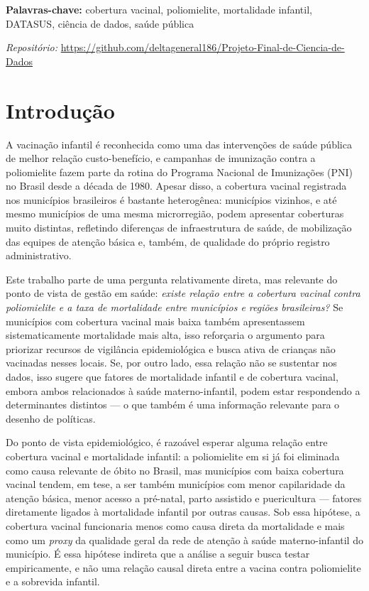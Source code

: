 \documentclass[pdflatex,sn-mathphys-num]{sn-jnl}
\begin{document}
\noindent\textbf{Palavras-chave:} cobertura vacinal, poliomielite, mortalidade infantil, DATASUS, ciência de dados, saúde pública

\noindent\small\emph{Repositório:} \url{https://github.com/deltageneral186/Projeto-Final-de-Ciencia-de-Dados}


\vspace{1em}

\section{Introdução}\label{sec:intro}

A vacinação infantil é reconhecida como uma das intervenções de saúde pública de melhor relação custo-benefício, e campanhas de imunização contra a poliomielite fazem parte da rotina do Programa Nacional de Imunizações (PNI) no Brasil desde a década de 1980. Apesar disso, a cobertura vacinal registrada nos municípios brasileiros é bastante heterogênea: municípios vizinhos, e até mesmo municípios de uma mesma microrregião, podem apresentar coberturas muito distintas, refletindo diferenças de infraestrutura de saúde, de mobilização das equipes de atenção básica e, também, de qualidade do próprio registro administrativo.

Este trabalho parte de uma pergunta relativamente direta, mas relevante do ponto de vista de gestão em saúde: \emph{existe relação entre a cobertura vacinal contra poliomielite e a taxa de mortalidade entre municípios e regiões brasileiras?} Se municípios com cobertura vacinal mais baixa também apresentassem sistematicamente mortalidade mais alta, isso reforçaria o argumento para priorizar recursos de vigilância epidemiológica e busca ativa de crianças não vacinadas nesses locais. Se, por outro lado, essa relação não se sustentar nos dados, isso sugere que fatores de mortalidade infantil e de cobertura vacinal, embora ambos relacionados à saúde materno-infantil, podem estar respondendo a determinantes distintos — o que também é uma informação relevante para o desenho de políticas.

Do ponto de vista epidemiológico, é razoável esperar alguma relação entre cobertura vacinal e mortalidade infantil: a poliomielite em si já foi eliminada como causa relevante de óbito no Brasil, mas municípios com baixa cobertura vacinal tendem, em tese, a ser também municípios com menor capilaridade da atenção básica, menor acesso a pré-natal, parto assistido e puericultura — fatores diretamente ligados à mortalidade infantil por outras causas. Sob essa hipótese, a cobertura vacinal funcionaria menos como causa direta da mortalidade e mais como um \emph{proxy} da qualidade geral da rede de atenção à saúde materno-infantil do município. É essa hipótese indireta que a análise a seguir busca testar empiricamente, e não uma relação causal direta entre a vacina contra poliomielite e a sobrevida infantil.
\end{document}

